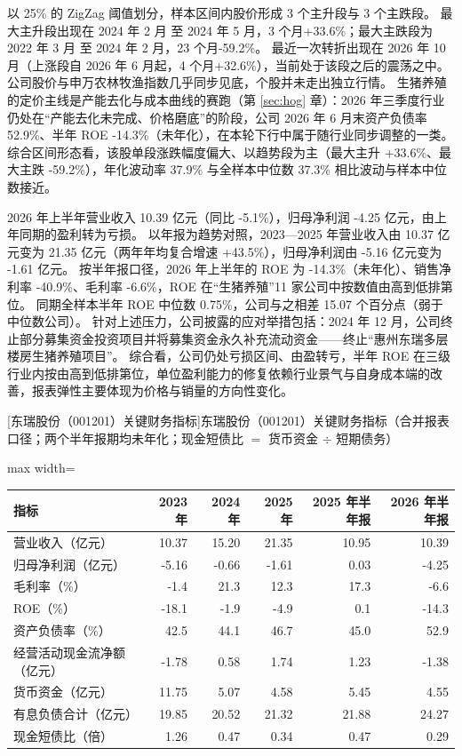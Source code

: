  以 25\% 的 ZigZag 阈值划分，样本区间内股价形成 3 个主升段与 3 个主跌段。 最大主升段出现在 2024 年 2 月 至 2024 年 5 月，3 个月+33.6\%；最大主跌段为 2022 年 3 月 至 2024 年 2 月，23 个月-59.2\%。 最近一次转折出现在 2026 年 10 月（上涨段自 2026 年 6 月起，4 个月+32.6\%），当前处于该段之后的震荡之中。 公司股价与申万农林牧渔指数几乎同步见底，个股并未走出独立行情。 生猪养殖的定价主线是产能去化与成本曲线的赛跑（第 \ref{sec:hog} 章）：2026 年三季度行业仍处在“产能去化未完成、价格磨底”的阶段，公司 2026 年 6 月末资产负债率 52.9\%、半年 ROE -14.3\%（未年化），在本轮下行中属于随行业同步调整的一类。 综合区间形态看，该股单段涨跌幅度偏大、以趋势段为主（最大主升 +33.6\%、最大主跌 -59.2\%），年化波动率 37.9\% 与全样本中位数 37.3\% 相比波动与样本中位数接近。

 2026 年上半年营业收入 10.39 亿元（同比 -5.1\%），归母净利润 -4.25 亿元，由上年同期的盈利转为亏损。 以年报为趋势对照，2023---2025 年营业收入由 10.37 亿元变为 21.35 亿元（两年年均复合增速 +43.5\%），归母净利润由 -5.16 亿元变为 -1.61 亿元。 按半年报口径，2026 年上半年的 ROE 为 -14.3\%（未年化）、销售净利率 -40.9\%、毛利率 -6.6\%，ROE 在“生猪养殖”11 家公司中按数值由高到低排第位。 同期全样本半年 ROE 中位数 0.75\%，公司与之相差 15.07 个百分点（弱于中位数公司）。 针对上述压力，公司披露的应对举措包括：2024 年 12 月，公司终止部分募集资金投资项目并将募集资金永久补充流动资金——终止“惠州东瑞多层楼房生猪养殖项目”。 综合看，公司仍处亏损区间、由盈转亏，半年 ROE 在三级行业内按由高到低排第位，单位盈利能力的修复依赖行业景气与自身成本端的改善，报表弹性主要体现为价格与销量的方向性变化。

\begin{center}\small\setlength{\tabcolsep}{3.4pt}
[东瑞股份（001201）关键财务指标]{东瑞股份（001201）关键财务指标（合并报表口径；两个半年报期均未年化；现金短债比 $=$ 货币资金 $\div$ 短期债务）}
\begin{adjustbox}{max width=\textwidth}
\begin{tabular}{@{}lrrrrr@{}}
\toprule
指标 & 2023 年 & 2024 年 & 2025 年 & 2025 年半年报 & 2026 年半年报 \\
\midrule
营业收入（亿元） & 10.37 & 15.20 & 21.35 & 10.95 & 10.39 \\
归母净利润（亿元） & -5.16 & -0.66 & -1.61 & 0.03 & -4.25 \\
毛利率（\%） & -1.4 & 21.3 & 12.3 & 17.3 & -6.6 \\
ROE（\%） & -18.1 & -1.9 & -4.9 & 0.1 & -14.3 \\
资产负债率（\%） & 42.5 & 44.1 & 46.7 & 45.0 & 52.9 \\
经营活动现金流净额（亿元） & -1.78 & 0.58 & 1.74 & 1.23 & -1.38 \\
货币资金（亿元） & 11.75 & 5.07 & 4.58 & 5.45 & 4.55 \\
有息负债合计（亿元） & 19.85 & 20.52 & 21.32 & 21.88 & 24.27 \\
现金短债比（倍） & 1.26 & 0.47 & 0.34 & 0.47 & 0.29 \\
\bottomrule
\end{tabular}
\end{adjustbox}
\end{center}


